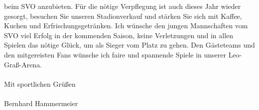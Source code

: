 \begin{doublespace}
beim SVO anzubieten.
Für die nötige Verpflegung ist auch dieses Jahr wieder gesorgt, besuchen Sie unseren Stadionverkauf
und stärken Sie sich mit Kaffee, Kuchen und Erfrischungsgetränken.
Ich wünsche den jungen Mannschaften vom SVO viel Erfolg in der kommenden Saison, keine
Verletzungen und in allen Spielen das nötige Glück, um als Sieger vom Platz zu gehen.
Den Gästeteams und den mitgereisten Fans wünsche ich faire und spannende Spiele in unserer Leo-Graß-Arena.\\
\\
Mit sportlichen Grüßen\\
\\
Bernhard Hammermeier
\end{doublespace}